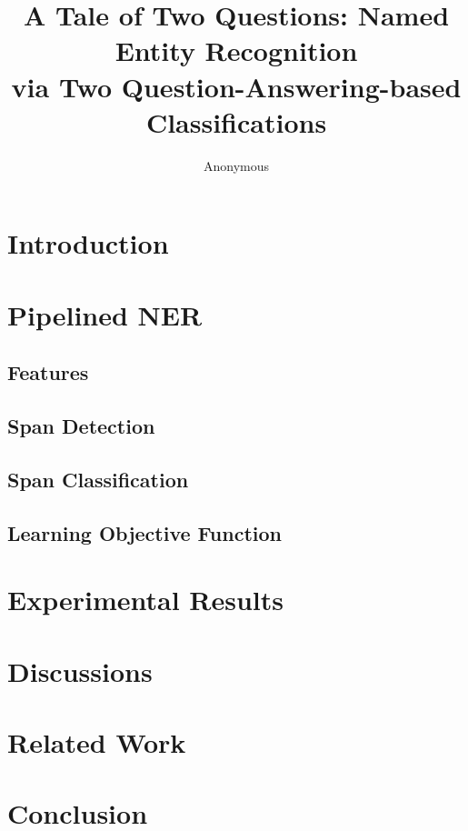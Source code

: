 \documentclass[letterpaper]{article} %
\title{A Tale of Two Questions: Named Entity Recognition \\ via Two Question-Answering-based Classifications}
\author {
    Anonymous
}
\begin{document}
\maketitle
\begin{abstract}

\end{abstract}

\section{Introduction}
\label{sec:intro}


\section{Pipelined NER}
\label{sec:method}


\subsection{Features}
\label{sec:features}


\subsection{Span Detection}
\label{sec:span}


\subsection{Span Classification}
\label{sec:class}


\subsection{Learning Objective Function}
\label{sec:loss}


\section{Experimental Results}
\label{sec:exp}


\section{Discussions}
\label{sec:discussion}


\section{Related Work}
\label{sec:related}


\section{Conclusion}





%


\end{document}
